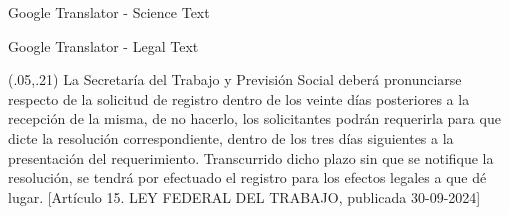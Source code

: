 \documentclass{beamer}
\begin{document}
\begin{frame} {Google Translator - Science Text}
 
\end{frame}


\begin{frame} {Google Translator - Legal Text}
\begin{textblock}{1}(.05,.21)
  \footnotesize {La Secretar\'ia del Trabajo y Previsi\'on Social deber\'a pronunciarse respecto de la solicitud de registro
dentro de los veinte d\'ias posteriores a la recepci\'on de la misma, de no hacerlo, los solicitantes podr\'an
requerirla para que dicte la resoluci\'on correspondiente, dentro de los tres d\'ias siguientes a la
presentaci\'on del requerimiento. Transcurrido dicho plazo sin que se notifique la resoluci\'on, se tendr\'a por
efectuado el registro para los efectos legales a que d\'e lugar. [Art\'iculo 15. LEY FEDERAL DEL TRABAJO, publicada 30-09-2024] }
\end{textblock}

\end{frame}
\end{document}
